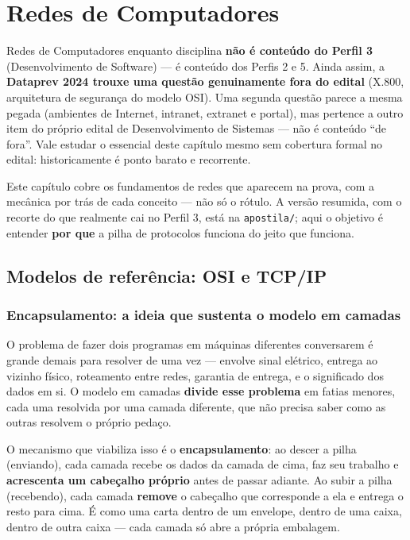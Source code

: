 \chapter{Redes de Computadores}
\label{cap:redes-teoria}

\begin{conceito}
Redes de Computadores enquanto disciplina \textbf{não é conteúdo do Perfil
3} (Desenvolvimento de Software) --- é conteúdo dos Perfis 2 e 5. Ainda
assim, a \textbf{Dataprev 2024 trouxe uma questão genuinamente fora do
edital} (X.800, arquitetura de segurança do modelo OSI). Uma segunda
questão parece a mesma pegada (ambientes de Internet, intranet, extranet e
portal), mas pertence a outro item do próprio edital de Desenvolvimento de
Sistemas --- não é conteúdo ``de fora''. Vale estudar o essencial deste
capítulo mesmo sem cobertura formal no edital: historicamente é ponto
barato e recorrente.
\end{conceito}

Este capítulo cobre os fundamentos de redes que aparecem na prova, com a
mecânica por trás de cada conceito --- não só o rótulo. A versão resumida,
com o recorte do que realmente cai no Perfil 3, está na
\texttt{apostila/}; aqui o objetivo é entender \textbf{por que} a pilha de
protocolos funciona do jeito que funciona.

\section{Modelos de referência: OSI e TCP/IP}

\subsection{Encapsulamento: a ideia que sustenta o modelo em camadas}

\begin{conceito}
O problema de fazer dois programas em máquinas diferentes conversarem é
grande demais para resolver de uma vez --- envolve sinal elétrico, entrega
ao vizinho físico, roteamento entre redes, garantia de entrega, e o
significado dos dados em si. O modelo em camadas \textbf{divide esse
problema} em fatias menores, cada uma resolvida por uma camada diferente,
que não precisa saber como as outras resolvem o próprio pedaço.

O mecanismo que viabiliza isso é o \textbf{encapsulamento}: ao descer a
pilha (enviando), cada camada recebe os dados da camada de cima, faz seu
trabalho e \textbf{acrescenta um cabeçalho próprio} antes de passar adiante.
Ao subir a pilha (recebendo), cada camada \textbf{remove} o cabeçalho que
corresponde a ela e entrega o resto para cima. É como uma carta dentro de
um envelope, dentro de uma caixa, dentro de outra caixa --- cada camada só
abre a própria embalagem.
\end{conceito}

